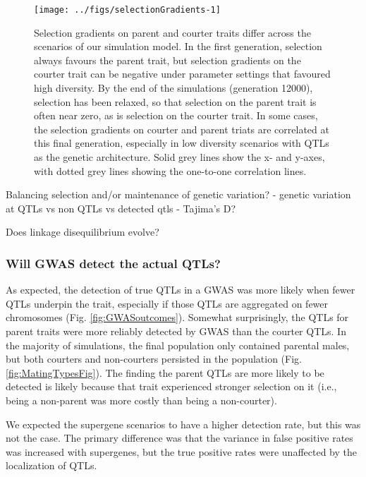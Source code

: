 \documentclass[
  11pt,
]{article}
\begin{document}
\begin{figure}[H]
\texttt{[image: ../figs/selectionGradients-1]} \caption{Selection gradients on parent and courter traits differ across the scenarios of our simulation model. In the first generation, selection always favours the parent trait, but selection gradients on the courter trait can be negative under parameter settings that favoured high diversity. By the end of the simulations (generation 12000), selection has been relaxed, so that selection on the parent trait is often near zero, as is selection on the courter trait. In some cases, the selection gradients on courter and parent triats are correlated at this final generation, especially in low diversity scenarios with QTLs as the genetic architecture. Solid grey lines show the x- and y-axes, with dotted grey lines showing the one-to-one correlation lines.}\label{fig:selectionGradients}
\end{figure}

Balancing selection and/or maintenance of genetic variation? - genetic
variation at QTLs vs non QTLs vs detected qtls - Tajima's D?

Does linkage disequilibrium evolve?

\hypertarget{will-gwas-detect-the-actual-qtls}{%
\subsubsection{Will GWAS detect the actual QTLs?}\label{will-gwas-detect-the-actual-qtls}}

As expected, the detection of true QTLs in a GWAS was more likely when
fewer QTLs underpin the trait, especially if those QTLs are aggregated
on fewer chromosomes (Fig. \ref{fig:GWASoutcomes}). Somewhat
surprisingly, the QTLs for parent traits were more reliably detected by
GWAS than the courter QTLs. In the majority of simulations, the final
population only contained parental males, but both courters and
non-courters persisted in the population (Fig.
\ref{fig:MatingTypesFig}). The finding the parent QTLs are more likely
to be detected is likely because that trait experienced stronger
selection on it (i.e., being a non-parent was more costly than being a
non-courter).

We expected the supergene scenarios to have a higher detection rate, but
this was not the case. The primary difference was that the variance in
false positive rates was increased with supergenes, but the true
positive rates were unaffected by the localization of QTLs.
\end{document}
